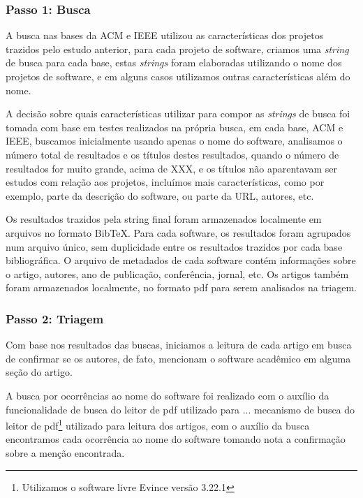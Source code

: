 \subsubsection{Passo 1: Busca}


A busca nas bases da ACM e IEEE utilizou as características dos projetos trazidos
pelo estudo anterior, para cada projeto de software, criamos uma {\it string} de
busca para cada base, estas {\it strings} foram elaboradas utilizando o nome dos
projetos de software, e em alguns casos utilizamos outras características além do
nome.

A decisão sobre quais características utilizar para compor as {\it strings} de busca
foi tomada com base em testes realizados na própria busca, em cada base, ACM e IEEE,
buscamos inicialmente usando apenas o nome do software, analisamos o número total
de resultados e os títulos destes resultados, quando o número de resultados for
muito grande, acima de XXX, e os títulos não aparentavam ser estudos com relação
aos projetos, incluímos mais características, como por exemplo, parte da descrição
do software, ou parte da URL, autores, etc.

Os resultados trazidos pela string final foram armazenados localmente em
arquivos no formato BibTeX. Para cada software, os resultados foram agrupados
num arquivo único, sem duplicidade entre os resultados trazidos por cada base
bibliográfica. O arquivo de metadados de cada software contém informações sobre
o artigo, autores, ano de publicação, conferência, jornal, etc. Os artigos
também foram armazenados localmente, no formato pdf para serem analisados na
triagem.

\subsubsection{Passo 2: Triagem}


Com base nos resultados das buscas, iniciamos a leitura de cada artigo em busca
de confirmar se os autores, de fato, mencionam o software acadêmico em alguma
seção do artigo.

A busca por ocorrências ao nome do software foi realizado com o auxílio da
funcionalidade de busca do leitor de pdf utilizado para ...  mecanismo de busca
do leitor de pdf\footnote{Utilizamos o software livre Evince versão 3.22.1}
utilizado para leitura dos artigos, com o auxílio da busca encontramos cada
ocorrência ao nome do software tomando nota a confirmação sobre a menção
encontrada.

